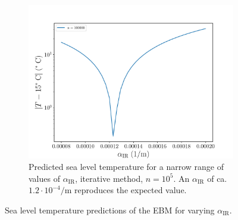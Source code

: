 \documentclass[a4paper,DIV=12,english]{scrartcl}
\begin{document}
\begin{figure}
\begin{subfigure}{0.49\textwidth}
        \label{subfig:alpha_full}
    \end{subfigure}\\
    \begin{subfigure}{0.49\textwidth}
        \centering
        \includegraphics[width=\textwidth]{../plots/temp_full_it/full_alpha_log.pdf}
        \caption{Predicted sea level temperature for a narrow range of values of $\alpha_{\text{IR}}$, iterative method, $n=10^5$. An $\alpha_{\text{IR}}$ of ca. $1.2\cdot 10^{-4}/\text{m}$ reproduces the expected value.}
        \label{subfig:alpha_log}
    \end{subfigure}
    \caption{Sea level temperature predictions of the EBM for varying $\alpha_{\text{IR}}$.}
    \label{fig:alpha}
\end{figure}

\FloatBarrier
\end{document}
